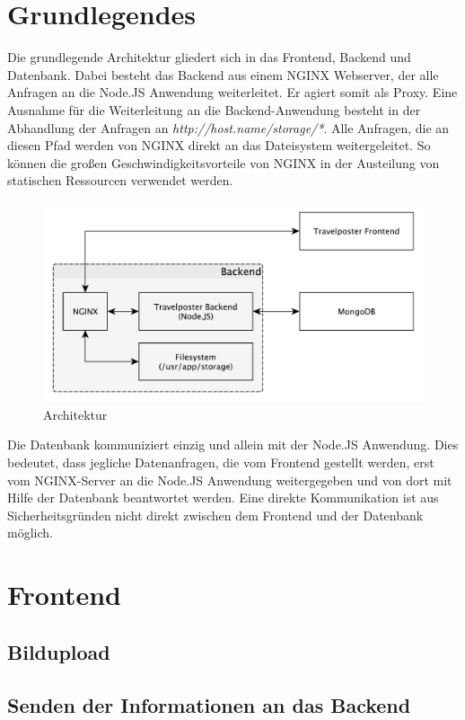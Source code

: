 \documentclass[12pt,a4paper]{report}
\begin{document}
\section{Grundlegendes}

Die grundlegende  Architektur gliedert sich in das Frontend, Backend und Datenbank. Dabei besteht das Backend aus einem NGINX Webserver, der alle Anfragen an die Node.JS Anwendung weiterleitet. Er agiert somit als Proxy. Eine Ausnahme für die Weiterleitung an die Backend-Anwendung besteht in der Abhandlung der Anfragen an \textit{http://host.name/storage/*}. Alle Anfragen, die an diesen Pfad werden von NGINX direkt an das Dateisystem weitergeleitet. So können die großen Geschwindigkeitsvorteile von NGINX in der Austeilung von statischen Ressourcen verwendet werden.

\begin{figure}[h]
	\centering
	\includegraphics[width=0.7\linewidth]{Bilder_Doku/architecture_overview}
	\caption[]{Architektur}
\end{figure}

Die Datenbank kommuniziert einzig und allein mit der Node.JS Anwendung. Dies bedeutet, dass jegliche Datenanfragen, die vom Frontend gestellt werden, erst vom NGINX-Server an die Node.JS Anwendung weitergegeben und von dort mit Hilfe der Datenbank beantwortet werden. Eine direkte Kommunikation ist aus Sicherheitsgründen nicht direkt zwischen dem Frontend und der Datenbank möglich.

\section{Frontend}




\subsection{Bildupload}

\subsection{Senden der Informationen an das Backend}
\end{document}
